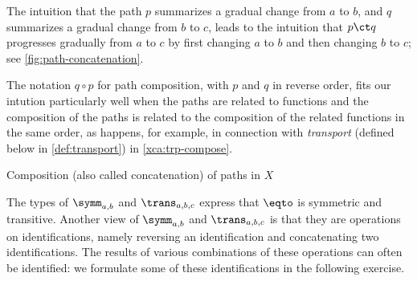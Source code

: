 The intuition that the path $p$ summarizes a gradual change from $a$ to $b$, and $q$ summarizes a gradual change from $b$ to $c$, leads to the
intuition that $p \ct q$ progresses gradually from $a$ to $c$ by first changing $a$ to $b$ and then changing $b$ to $c$; see
\cref{fig:path-concatenation}.

The notation $q\circ p$ for path composition, with $p$ and $q$ in reverse order,
fits our intution particularly well when the paths are related to functions and the composition of
the paths is related to the composition of the related functions in the same order, as happens, for example, in connection with {\em transport}
(defined below in \cref{def:transport}) in \cref{xca:trp-compose}.

\begin{marginfigure}
  \caption{Composition (also called concatenation) of paths in $X$}
  \label{fig:path-concatenation}
\end{marginfigure}

The types of $\symm_{a,b}$ and $\trans_{a,b,c}$ express that
$\eqto$ is symmetric and transitive. Another view of
$\symm_{a,b}$ and $\trans_{a,b,c}$ is that they are
operations on identifications, namely reversing an identification
and concatenating two identifications. The results of various
combinations of these operations can often be identified:
we formulate some of these identifications in the following exercise.

